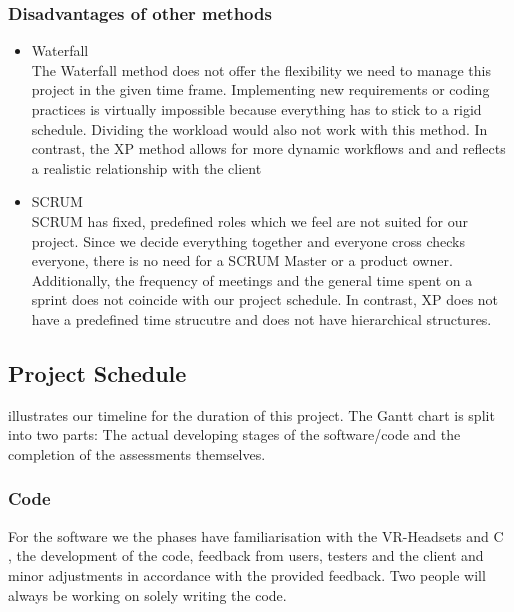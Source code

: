 \documentclass[coverpage,lineno]{../custom}
\begin{document}
\subsubsection{Disadvantages of other methods}
\begin{itemize}
    \item Waterfall \\
    The Waterfall method does not offer the flexibility we need to manage this project in the given time frame. Implementing new requirements or coding practices is virtually impossible because everything has to stick to a rigid schedule. Dividing the workload would also not work with this method. In contrast, the XP method allows for more dynamic workflows and and reflects a realistic relationship with the client
    \item SCRUM \\
    SCRUM has fixed, predefined roles which we feel are not suited for our project. Since we decide everything together and everyone cross checks everyone, there is no need for a SCRUM Master or a product owner. Additionally, the frequency of meetings and the general time spent on a sprint does not coincide with our project schedule. In contrast, XP does not have a predefined time strucutre and does not have hierarchical structures.   
    
    
\end{itemize}

\subsection{Project Schedule}
\label{ssec:schedule}

 illustrates our timeline for the duration of this project. The Gantt chart is split into two parts: The actual developing stages of the software/code and the completion of the assessments themselves. 
\subsubsection{Code}
For the software we the phases have familiarisation with the VR-Headsets and C \sharp, the development of the code, feedback from users, testers and the client and minor adjustments in accordance with the provided feedback. Two people will always be working on solely writing the code. 
\end{document}
